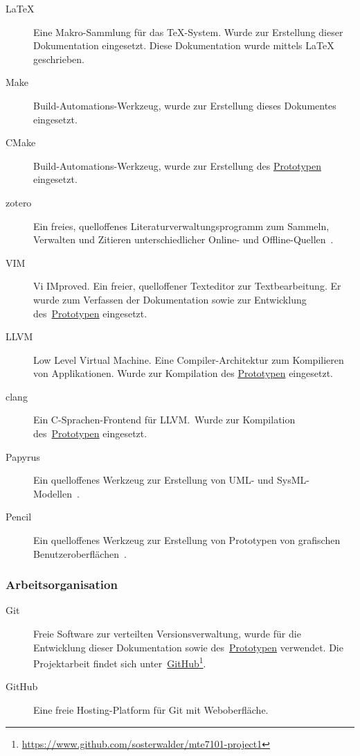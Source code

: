 \begin{description}
    \item[\LaTeX] Eine Makro-Sammlung für das \TeX-System. Wurde zur
        Erstellung dieser Dokumentation eingesetzt. Diese Dokumentation
        wurde mittels \LaTeX{} geschrieben.
    \item[Make] Build-Automations-Werkzeug, wurde zur Erstellung dieses Dokumentes eingesetzt.
    \item[CMake] Build-Automations-Werkzeug, wurde zur Erstellung des
        \hyperref[chap:prototype]{Prototypen} eingesetzt.
    \item[zotero] Ein freies, quelloffenes Literaturverwaltungsprogramm
        zum Sammeln, Verwalten und Zitieren unterschiedlicher Online-
        und Offline-Quellen~\parencite{wikipedia_foundation_zotero_2015}.
    \item[VIM] Vi IMproved. Ein freier, quelloffener Texteditor zur
        Textbearbeitung. Er wurde zum Verfassen der Dokumentation sowie zur
        Entwicklung des~\hyperref[chap:prototype]{Prototypen} eingesetzt.
    \item[LLVM] Low Level Virtual Machine. Eine Compiler-Architektur zum
        Kompilieren von Applikationen. Wurde zur Kompilation des
        \hyperref[chap:prototype]{Prototypen} eingesetzt.
    \item[clang] Ein C-Sprachen-Frontend für LLVM.\ Wurde zur Kompilation
        des~\hyperref[chap:prototype]{Prototypen} eingesetzt.
    \item[Papyrus] Ein quelloffenes Werkzeug zur Erstellung von UML- und
        SysML-Modellen~\parencite{the_eclipse_foundation_papyrus_2015}.
    \item[Pencil] Ein quelloffenes Werkzeug zur Erstellung von Prototypen von
        grafischen Benutzeroberflächen~\parencite{evolus_pencil_2015}.
\end{description}


\subsubsection{Arbeitsorganisation}
\label{ssubsec:tools_software:job_organisation}

\begin{description}
    \item[Git] Freie Software zur verteilten Versionsverwaltung, wurde
        für die Entwicklung dieser Dokumentation sowie
        des~\hyperref[chap:prototype]{Prototypen} verwendet. Die
        Projektarbeit findet sich
        unter~\href{https://www.github.com/sosterwalder/mte7101-project1}{GitHub}\footnote{
        \href{https://www.github.com/sosterwalder/mte7101-project1}{https://www.github.com/sosterwalder/mte7101-project1}
    }.
    \item[GitHub] Eine freie Hosting-Platform für Git mit Weboberfläche.
\end{description}

